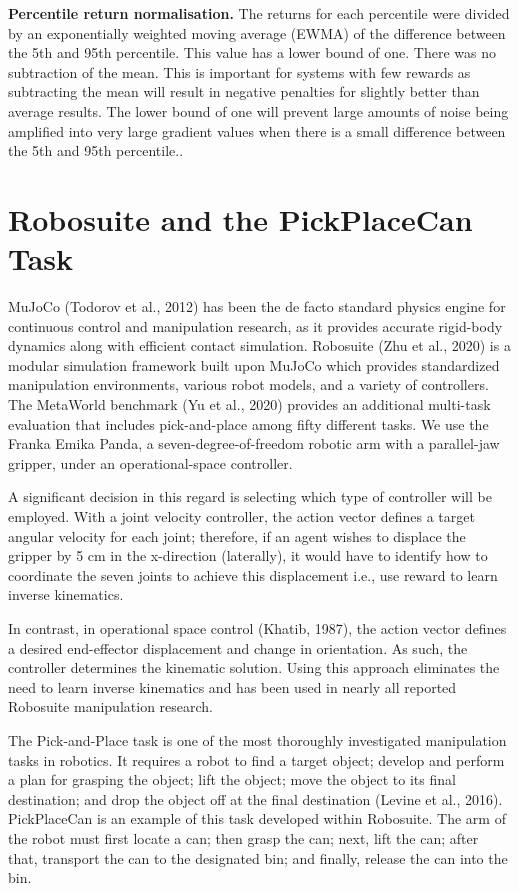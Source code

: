 \documentclass[12pt,a4paper,oneside]{report}
\begin{document}
\textbf{Percentile return normalisation.} The returns for each percentile were divided by an exponentially weighted moving average (EWMA) of the difference between the 5th and 95th percentile. This value has a lower bound of one. There was no subtraction of the mean. This is important for systems with few rewards as subtracting the mean will result in negative penalties for slightly better than average results. The lower bound of one will prevent large amounts of noise being amplified into very large gradient values when there is a small difference between the 5th and 95th percentile..

\hypertarget{robosuite-and-the-pickplacecan-task}{%
\section{Robosuite and the PickPlaceCan Task}\label{robosuite-and-the-pickplacecan-task}}

MuJoCo (Todorov et al., 2012) has been the de facto standard physics engine for continuous
control and manipulation research, as it provides accurate rigid-body dynamics along with
efficient contact simulation. Robosuite (Zhu et al., 2020) is a modular simulation framework
built upon MuJoCo which provides standardized manipulation environments, various robot models,
and a variety of controllers. The MetaWorld benchmark (Yu et al., 2020) provides an additional
multi-task evaluation that includes pick-and-place among fifty different tasks. We use the
Franka Emika Panda, a seven-degree-of-freedom robotic arm with a parallel-jaw gripper,
under an operational-space controller.

A significant decision in this regard is selecting which type of controller will be employed. With a joint velocity controller, the action vector defines a target angular velocity for each joint; therefore, if an agent wishes to displace the gripper by 5 cm in the x-direction (laterally), it would have to identify how to coordinate the seven joints to achieve this displacement i.e., use reward to learn inverse kinematics.

In contrast, in operational space control (Khatib, 1987), the action vector defines a desired end-effector displacement and change in orientation. As such, the controller determines the kinematic solution. Using this approach eliminates the need to learn inverse kinematics and has been used in nearly all reported Robosuite manipulation research.

The Pick-and-Place task is one of the most thoroughly investigated manipulation tasks in robotics. It requires a robot to find a target object; develop and perform a plan for grasping the object; lift the object; move the object to its final destination; and drop the object off at the final destination (Levine et al., 2016). PickPlaceCan is an example of this task developed within Robosuite. The arm of the robot must first locate a can; then grasp the can; next, lift the can; after that, transport the can to the designated bin; and finally, release the can into the bin.
\end{document}
